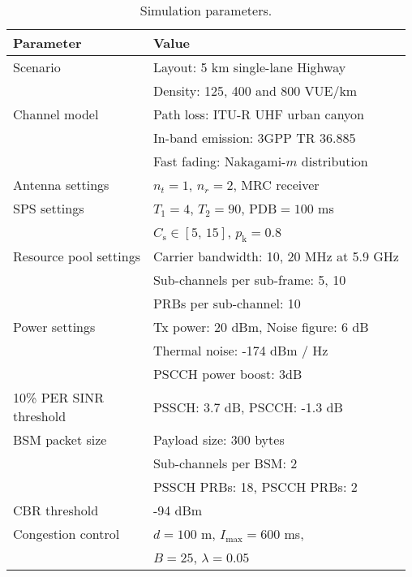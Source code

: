 \documentclass[conference]{IEEEtran}
\begin{document}
\begin{table}
\renewcommand{\arraystretch}{1.3}
  \centering
  \caption{Simulation parameters.}\label{tab_simpara}
  \centering\renewcommand{}
    \setcellgapes{500pt}\makegapedcells
        \begin{tabular}{l l}
        \hline
            \textbf{Parameter}  & \textbf{Value}\\
        \hline
            Scenario & Layout: 5 km single-lane Highway\\ 
            & Density: 125, 400 and 800 VUE/km\\
        \hline
            Channel model  & Path loss: ITU-R UHF urban canyon~\cite{toyota}\\  
            & In-band emission: 3GPP TR 36.885~\cite{3gpp37885}\\
            & Fast fading: Nakagami-$m$ distribution\\
        \hline
            Antenna settings & $n_t=1$, $n_r=2$, MRC receiver\\
        \hline 
           SPS settings & $T_\mathrm{1}=4$, $T_\mathrm{2}=90$, $\mathrm{PDB}=100$ ms\\
           & $C_{\mathrm{s}}\in{[5,\,15]}$, $p_{\mathrm{k}}=0.8$\\
        \hline
            Resource pool settings & Carrier bandwidth: 10, 20 MHz at 5.9 GHz\\
            &Sub-channels per sub-frame: 5, 10\\
            & PRBs per sub-channel: 10\\ 
        \hline
            Power settings   & Tx power: 20 dBm, Noise figure: 6 dB\\
            & Thermal noise: -174 dBm / Hz\\ 
            & PSCCH power boost: 3dB \\
        \hline
            \makecell{10\% PER SINR\\threshold} & PSSCH: 3.7 dB, PSCCH: -1.3 dB\\
        \hline
            BSM packet size & Payload size: 300 bytes\\
            & Sub-channels per BSM: 2\\
            & PSSCH PRBs: 18, PSCCH PRBs: 2\\
        \hline
            CBR threshold  & -94 dBm\\
        \hline
            Congestion control & $d=100$ m, $I_{\mathrm{max}}=600$ ms,\\
            & $B=25$, $\lambda=0.05$\\%
        \hline
        \end{tabular}
        \vspace{-.15in}
\end{table}
\end{document}
